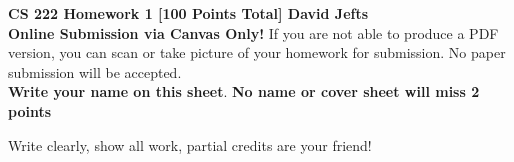 \documentclass[11pt]{article}
\begin{document}
{\Large {\bf CS 222 Homework 1 [100 Points Total] David Jefts}}  \\

\noindent \textbf{Online Submission via Canvas Only!} If you are not able to produce a PDF version, you can scan or take picture of your homework for submission. No paper submission will be accepted.\\

\noindent \textbf{Write your name on this sheet}. \textbf{No name or cover sheet will miss 2 points}

Write clearly, show all work, partial credits are your friend! 

\vspace{0.2in}



\end{document}
